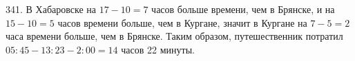 341. В Хабаровске на $17-10=7$ часов больше времени, чем в Брянске, и на $15-10=5$ часов времени больше, чем в Кургане, значит в Кургане на $7-5=2$ часа времени больше, чем в Брянске. Таким образом, путешественник потратил
$05:45-13:23-2:00=14$ часов 22 минуты.
\newpage
